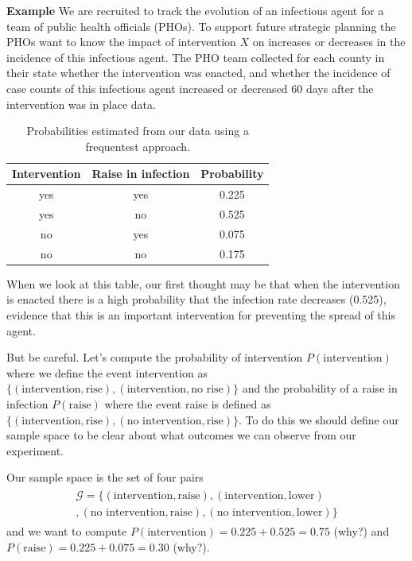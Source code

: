 \textbf{Example} We are recruited to track the evolution of an infectious agent for a team of public health officials (PHOs).
To support future strategic planning the PHOs want to know the impact of intervention $X$ on increases or decreases in the incidence of this infectious agent. The PHO team collected for each county in their state whether the intervention was enacted, and whether the incidence of case counts of this infectious agent increased or decreased 60 days after the intervention was in place data.
\begin{table}[ht!]
    \centering
    \begin{tabular}{ccc}
        \hline
        Intervention & Raise in infection & Probability \\
        \hline
        yes & yes  &  0.225   \\
        yes & no   &  0.525 \\
        no  & yes  &  0.075\\
        no  & no   &  0.175\\
        \hline
    \end{tabular}
    \caption{Probabilities estimated from our data using a frequentest approach. \label{tab.datafreq}}
\end{table}
When we look at this table, our first thought may be that when the intervention is enacted there is a high probability that the infection rate decreases (0.525), evidence that this is an important intervention for preventing the spread of this agent.

But be careful. Let's compute the probability of intervention $P(\text{intervention})$ where we define the event intervention as $\{ (\text{intervention},\text{rise}), (\text{intervention}, \text{no rise})\}$ and the probability of a raise in infection $P(\text{raise})$ where the event raise is defined as $\{(\text{intervention},\text{rise}),(\text{no intervention}, \text{rise})\}$. To do this we should define our sample space to be clear about what outcomes we can observe from our experiment.

Our sample space is the set of four pairs
\begin{align}
    \begin{aligned}
    \mathcal{G}=\{ (\text{intervention},\text{raise}),(\text{intervention},\text{lower})\\
    ,(\text{no intervention},\text{raise})
    ,(\text{no intervention},\text{lower})\}
    \end{aligned}
\end{align}
and we want to compute $P(\text{intervention}) = 0.225 + 0.525 = 0.75$ (why?) and $P(\text{raise}) = 0.225+0.075 = 0.30$ (why?).


